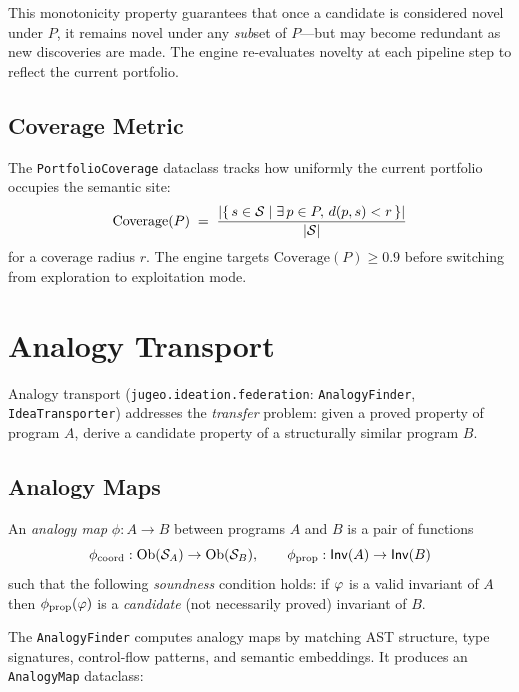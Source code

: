 \documentclass[11pt]{article}
\newcommand{\Inv}{\mathsf{Inv}}            %
\newcommand{\alg}[1]{\texttt{\small #1}}   %
\begin{document}
This monotonicity property guarantees that once a candidate is
considered novel under $P$, it remains novel under any \emph{sub}set
of $P$---but may become redundant as new discoveries are made.
The engine re-evaluates novelty at each pipeline step to reflect
the current portfolio.

\subsection{Coverage Metric}

The \texttt{PortfolioCoverage} dataclass tracks how uniformly
the current portfolio occupies the semantic site:
\[
  \mathrm{Coverage}(P) \;=\; \frac{|\{\, s \in \mathcal{S} \mid \exists\, p \in P,\,
    d(p, s) < r\,\}|}{|\mathcal{S}|}
\]
for a coverage radius $r$.  The engine targets
$\mathrm{Coverage}(P) \geq 0.9$ before switching from exploration
to exploitation mode.

\section{Analogy Transport}\label{sec:analogy}

Analogy transport
(\texttt{jugeo.ideation.federation}: \alg{AnalogyFinder},
\alg{IdeaTransporter}) addresses the \emph{transfer} problem: given a
proved property of program $A$, derive a candidate property of
a structurally similar program $B$.

\subsection{Analogy Maps}

\begin{definition}
An \emph{analogy map} $\phi: A \to B$ between programs $A$ and $B$
is a pair of functions
\[
  \phi_{\mathrm{coord}} : \Ob(\Site_A) \to \Ob(\Site_B),
  \qquad
  \phi_{\mathrm{prop}}  : \Inv(A) \to \Inv(B)
\]
such that the following \emph{soundness} condition holds: if
$\varphi$ is a valid invariant of $A$ then $\phi_{\mathrm{prop}}(\varphi)$
is a \emph{candidate} (not necessarily proved) invariant of $B$.
\end{definition}

The \alg{AnalogyFinder} computes analogy maps by matching AST
structure, type signatures, control-flow patterns, and semantic
embeddings.  It produces an \alg{AnalogyMap} dataclass:
\end{document}
